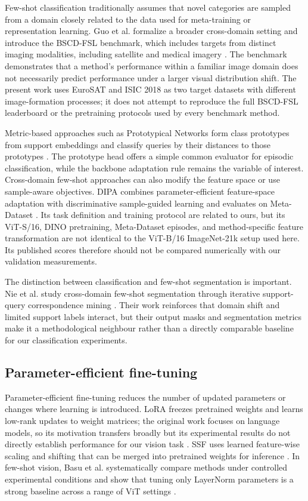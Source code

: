 \documentclass[11pt]{article}
\begin{document}
Few-shot classification traditionally assumes that novel categories are sampled from a domain closely related to the data used for meta-training or representation learning. Guo et al. formalize a broader cross-domain setting and introduce the BSCD-FSL benchmark, which includes targets from distinct imaging modalities, including satellite and medical imagery \cite{guo2020}. The benchmark demonstrates that a method's performance within a familiar image domain does not necessarily predict performance under a larger visual distribution shift. The present work uses EuroSAT and ISIC 2018 as two target datasets with different image-formation processes; it does not attempt to reproduce the full BSCD-FSL leaderboard or the pretraining protocols used by every benchmark method.

Metric-based approaches such as Prototypical Networks form class prototypes from support embeddings and classify queries by their distances to those prototypes \cite{snell2017}. The prototype head offers a simple common evaluator for episodic classification, while the backbone adaptation rule remains the variable of interest. Cross-domain few-shot approaches can also modify the feature space or use sample-aware objectives. DIPA combines parameter-efficient feature-space adaptation with discriminative sample-guided learning and evaluates on Meta-Dataset \cite{perera2024}. Its task definition and training protocol are related to ours, but its ViT-S/16, DINO pretraining, Meta-Dataset episodes, and method-specific feature transformation are not identical to the ViT-B/16 ImageNet-21k setup used here. Its published scores therefore should not be compared numerically with our validation measurements.

The distinction between classification and few-shot segmentation is important. Nie et al. study cross-domain few-shot segmentation through iterative support-query correspondence mining \cite{nie2024}. Their work reinforces that domain shift and limited support labels interact, but their output masks and segmentation metrics make it a methodological neighbour rather than a directly comparable baseline for our classification experiments.

\subsection{Parameter-efficient fine-tuning}

Parameter-efficient fine-tuning reduces the number of updated parameters or changes where learning is introduced. LoRA freezes pretrained weights and learns low-rank updates to weight matrices; the original work focuses on language models, so its motivation transfers broadly but its experimental results do not directly establish performance for our vision task \cite{lora2022}. SSF uses learned feature-wise scaling and shifting that can be merged into pretrained weights for inference \cite{lian2022}. In few-shot vision, Basu et al. systematically compare methods under controlled experimental conditions and show that tuning only LayerNorm parameters is a strong baseline across a range of ViT settings \cite{basu2024}.
\end{document}
